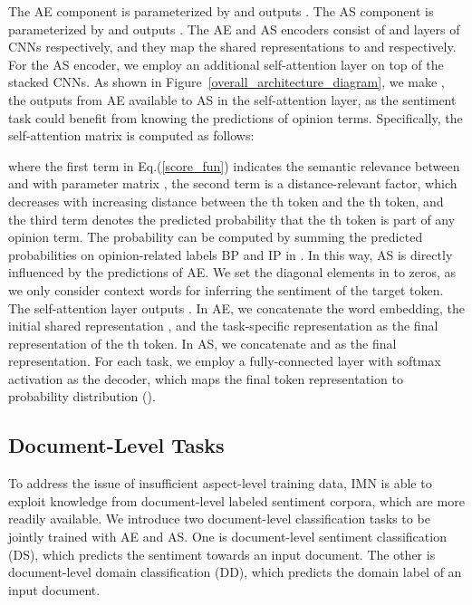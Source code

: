 \documentclass[11pt,a4paper]{article}
\begin{document}
The AE component  is parameterized by  and outputs . The AS component  is parameterized by  and outputs .
The AE and AS encoders consist of  and  layers of CNNs respectively, and they map the shared representations to  and  respectively. For the AS encoder, we employ an additional self-attention layer on top of the stacked CNNs.
As shown in Figure~\ref{overall_architecture_diagram}, we make , the outputs from AE available to AS in the self-attention layer, as the sentiment task could benefit from knowing the predictions of opinion terms.  Specifically, the self-attention matrix  is computed as follows:

\begin{small}

\end{small}
\noindent where the first term in Eq.(\ref{score_fun}) indicates the semantic relevance between  and  with parameter matrix , the second term is a distance-relevant factor, which decreases with increasing distance between the th token and the th token, and the third term  denotes the predicted probability that the th token is part of any opinion term. The probability  can be computed by summing the predicted probabilities on opinion-related labels BP and IP in  . In this way, AS is directly influenced by the predictions of AE. We set the diagonal elements in  to zeros, as we only consider context words for inferring the sentiment of the target token. The self-attention layer outputs . In AE, we concatenate the word embedding, the initial shared representation , and the task-specific representation   as the final representation of the th token. In AS, we concatenate  and  as the final representation. For each task, we employ a fully-connected layer with softmax activation as the decoder, which maps the final token representation to probability distribution  ().

\subsection{Document-Level Tasks}
To address the issue of insufficient aspect-level training data, IMN is able to exploit knowledge from document-level labeled sentiment corpora, which are more readily available. 
We introduce two document-level classification tasks to be jointly trained with AE and AS. One is document-level sentiment classification (DS), which predicts the sentiment towards an input document. The other is document-level domain classification (DD), which predicts the domain label of an input document.
\end{document}
